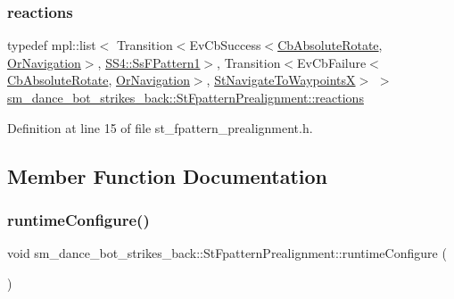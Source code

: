 \subsubsection{\texorpdfstring{reactions}{reactions}}
{\footnotesize\ttfamily typedef mpl\+::list$<$ Transition$<$Ev\+Cb\+Success$<$\hyperlink{classcl__move__base__z_1_1CbAbsoluteRotate}{Cb\+Absolute\+Rotate}, \hyperlink{classsm__dance__bot__strikes__back_1_1OrNavigation}{Or\+Navigation}$>$, \hyperlink{structsm__dance__bot__strikes__back_1_1SS4_1_1SsFPattern1}{S\+S4\+::\+Ss\+F\+Pattern1}$>$, Transition$<$Ev\+Cb\+Failure$<$\hyperlink{classcl__move__base__z_1_1CbAbsoluteRotate}{Cb\+Absolute\+Rotate}, \hyperlink{classsm__dance__bot__strikes__back_1_1OrNavigation}{Or\+Navigation}$>$, \hyperlink{structsm__dance__bot__strikes__back_1_1StNavigateToWaypointsX}{St\+Navigate\+To\+WaypointsX}$>$ $>$ \hyperlink{structsm__dance__bot__strikes__back_1_1StFpatternPrealignment_a0c187659c7f748fbf526e692e9e86430}{sm\+\_\+dance\+\_\+bot\+\_\+strikes\+\_\+back\+::\+St\+Fpattern\+Prealignment\+::reactions}}



Definition at line 15 of file st\+\_\+fpattern\+\_\+prealignment.\+h.



\subsection{Member Function Documentation}
\mbox{\label{structsm__dance__bot__strikes__back_1_1StFpatternPrealignment_a12d2806c617371082410914de7444238}} 
\subsubsection{\texorpdfstring{runtime\+Configure()}{runtimeConfigure()}}
{\footnotesize\ttfamily void sm\+\_\+dance\+\_\+bot\+\_\+strikes\+\_\+back\+::\+St\+Fpattern\+Prealignment\+::runtime\+Configure (\begin{DoxyParamCaption}{ }\end{DoxyParamCaption})\hspace{0.3cm}{\ttfamily [inline]}}




